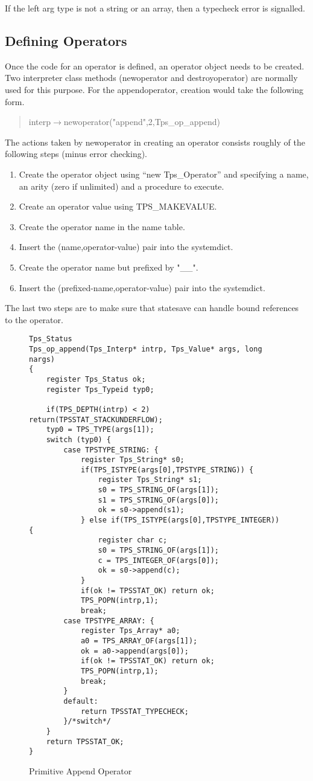 If the left arg type is not a string or an array, then
a typecheck error is signalled.

\subsection{Defining Operators}
\label{opdef}
Once the code for an operator is defined,
an operator object needs to be created.
Two interpreter class methods (newoperator and destroyoperator)
are normally used for this purpose.
For the appendoperator, creation would take the following form.
\begin{quote}
interp$\rightarrow$newoperator("append",2,Tps\_op\_append)
\end{quote}

The actions taken by newoperator in creating an operator
consists roughly of the following steps (minus error checking).
\begin{enumerate}
\item Create the operator object using ``new Tps\_Operator''
and specifying a name, an arity (zero if unlimited) and
a procedure to execute.
\item Create an operator value using TPS\_MAKEVALUE.
\item Create the operator name in the name table.
\item Insert the (name,operator-value) pair
into the systemdict.
\item Create the operator name but prefixed by "\_\_".
\item Insert the (prefixed-name,operator-value) pair
into the systemdict.
\end{enumerate}
The last two steps are to make sure that statesave can
handle bound references to the operator.
\begin{figure}[p]\centering
\begin{verbatim}
Tps_Status
Tps_op_append(Tps_Interp* intrp, Tps_Value* args, long nargs)
{
    register Tps_Status ok;
    register Tps_Typeid typ0;

    if(TPS_DEPTH(intrp) < 2) return(TPSSTAT_STACKUNDERFLOW);
    typ0 = TPS_TYPE(args[1]);
    switch (typ0) {
        case TPSTYPE_STRING: {
            register Tps_String* s0;
            if(TPS_ISTYPE(args[0],TPSTYPE_STRING)) {
                register Tps_String* s1;
                s0 = TPS_STRING_OF(args[1]);
                s1 = TPS_STRING_OF(args[0]);
                ok = s0->append(s1);
            } else if(TPS_ISTYPE(args[0],TPSTYPE_INTEGER)) {
                register char c;
                s0 = TPS_STRING_OF(args[1]);
                c = TPS_INTEGER_OF(args[0]);
                ok = s0->append(c);
            }
            if(ok != TPSSTAT_OK) return ok;
            TPS_POPN(intrp,1);
            break;
        case TPSTYPE_ARRAY: {
            register Tps_Array* a0;
            a0 = TPS_ARRAY_OF(args[1]);
            ok = a0->append(args[0]);
            if(ok != TPSSTAT_OK) return ok;
            TPS_POPN(intrp,1);
            break;
        }
        default:
            return TPSSTAT_TYPECHECK;
        }/*switch*/
    }
    return TPSSTAT_OK;
}
\end{verbatim}
\caption{Primitive Append Operator}
\label{appendop}
\end{figure}
\clearpage

